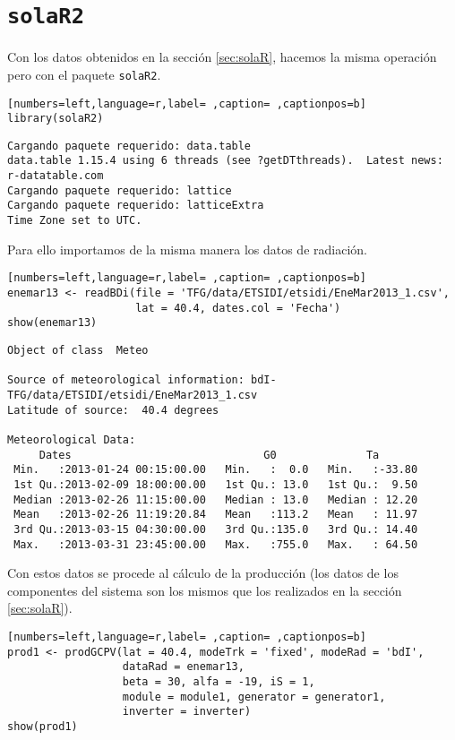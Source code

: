 \section{\texttt{solaR2}}
\label{sec:org57c03f0}
\label{sec:solaR2}
Con los datos obtenidos en la sección \ref{sec:solaR}, hacemos la misma operación pero con el paquete \texttt{solaR2}.
\begin{lstlisting}[numbers=left,language=r,label= ,caption= ,captionpos=b]
library(solaR2)
\end{lstlisting}

\begin{verbatim}
Cargando paquete requerido: data.table
data.table 1.15.4 using 6 threads (see ?getDTthreads).  Latest news: r-datatable.com
Cargando paquete requerido: lattice
Cargando paquete requerido: latticeExtra
Time Zone set to UTC.
\end{verbatim}


Para ello importamos de la misma manera los datos de radiación.
\begin{lstlisting}[numbers=left,language=r,label= ,caption= ,captionpos=b]
enemar13 <- readBDi(file = 'TFG/data/ETSIDI/etsidi/EneMar2013_1.csv',
                    lat = 40.4, dates.col = 'Fecha')
show(enemar13)
\end{lstlisting}

\begin{verbatim}
Object of class  Meteo 

Source of meteorological information: bdI-TFG/data/ETSIDI/etsidi/EneMar2013_1.csv 
Latitude of source:  40.4 degrees

Meteorological Data:
     Dates                              G0              Ta        
 Min.   :2013-01-24 00:15:00.00   Min.   :  0.0   Min.   :-33.80  
 1st Qu.:2013-02-09 18:00:00.00   1st Qu.: 13.0   1st Qu.:  9.50  
 Median :2013-02-26 11:15:00.00   Median : 13.0   Median : 12.20  
 Mean   :2013-02-26 11:19:20.84   Mean   :113.2   Mean   : 11.97  
 3rd Qu.:2013-03-15 04:30:00.00   3rd Qu.:135.0   3rd Qu.: 14.40  
 Max.   :2013-03-31 23:45:00.00   Max.   :755.0   Max.   : 64.50
\end{verbatim}

Con estos datos se procede al cálculo de la producción (los datos de los componentes del sistema son los mismos que los realizados en la sección \ref{sec:solaR}).
\begin{lstlisting}[numbers=left,language=r,label= ,caption= ,captionpos=b]
prod1 <- prodGCPV(lat = 40.4, modeTrk = 'fixed', modeRad = 'bdI',
                  dataRad = enemar13,
                  beta = 30, alfa = -19, iS = 1,
                  module = module1, generator = generator1,
                  inverter = inverter)
show(prod1)
\end{lstlisting}

